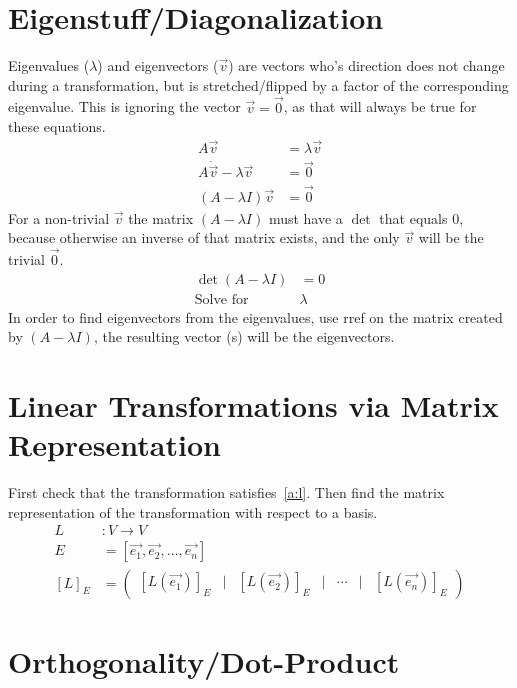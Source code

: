 \documentclass[12pt]{article}
\begin{document}
\section{Eigenstuff/Diagonalization}\label{e}
Eigenvalues ($\lambda$) and eigenvectors ($\vec{v}$) are vectors who's direction does not change during a transformation, but is stretched/flipped by a factor of the corresponding eigenvalue. This is ignoring the vector $\vec{v} = \vec{0}$, as that will always be true for these equations.
\begin{align}
  A\vec{v} &= \lambda\vec{v}\\
  A\dot \vec{v}-\lambda\vec{v} &= \vec{0}\\
  \left(A-\lambda I\right)\vec{v} &= \vec{0}
\end{align}
For a non-trivial $\vec{v}$ the matrix $\left(A -\lambda I\right)$ must have a $\det$ that equals $0$, because otherwise an inverse of that matrix exists, and the only $\vec{v}$ will be the trivial $\vec{0}$.
\begin{align}
  \det\left(A-\lambda I\right) &= 0\\
  \text{Solve for}\ &\lambda
\end{align}
In order to find eigenvectors from the eigenvalues, use rref on the matrix created by $\left(A - \lambda I\right)$, the resulting vector (s) will be the eigenvectors.
\section{Linear Transformations via Matrix Representation}\label{l}
First check that the transformation satisfies~\ref{a:l}. Then find the matrix representation of the transformation with respect to a basis.
\begin{align}
  L&:V\rightarrow V\\
  E &= \left[\vec{e_1},\vec{e_2},\ldots,\vec{e_n}\right]\\
  {\left[L\right]}_E &= \left(\begin{array}{ccccccc}
    {\left[L\left(\vec{e_1}\right)\right]}_E & | & {\left[L\left(\vec{e_2}\right)\right]}_E & | & \cdots & | & {\left[L\left(\vec{e_n}\right)\right]}_E
  \end{array}\right)
\end{align}
\section{Orthogonality/Dot-Product}\label{o}
\end{document}
